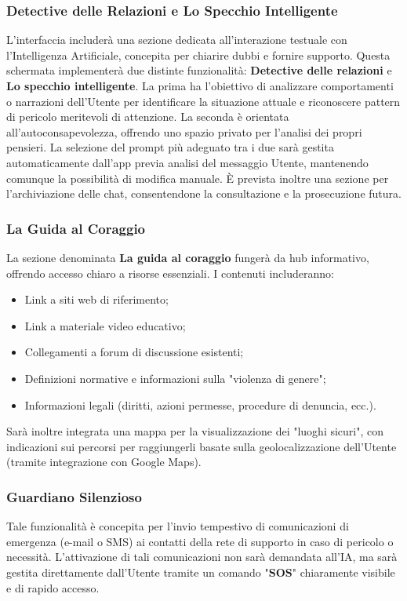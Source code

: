 \documentclass[a4paper,12pt]{article}
\begin{document}
\subsubsection{Detective delle Relazioni e Lo Specchio Intelligente}
L'interfaccia includerà una sezione dedicata all'interazione testuale con l'Intelligenza Artificiale, concepita per chiarire dubbi e fornire supporto. Questa schermata implementerà due distinte funzionalità: \textbf{Detective delle relazioni} e \textbf{Lo specchio intelligente}.
La prima ha l'obiettivo di analizzare comportamenti o narrazioni dell'Utente per identificare la situazione attuale e riconoscere pattern di pericolo meritevoli di attenzione. La seconda è orientata all'autoconsapevolezza, offrendo uno spazio privato per l'analisi dei propri pensieri.
La selezione del prompt più adeguato tra i due sarà gestita automaticamente dall'app previa analisi del messaggio Utente, mantenendo comunque la possibilità di modifica manuale. È prevista inoltre una sezione per l'archiviazione delle chat, consentendone la consultazione e la prosecuzione futura.

\subsubsection{La Guida al Coraggio}
La sezione denominata \textbf{La guida al coraggio} fungerà da hub informativo, offrendo accesso chiaro a risorse essenziali. I contenuti includeranno:
\begin{itemize}
    \item Link a siti web di riferimento;
    \item Link a materiale video educativo;
    \item Collegamenti a forum di discussione esistenti;
    \item Definizioni normative e informazioni sulla "violenza di genere";
    \item Informazioni legali (diritti, azioni permesse, procedure di denuncia, ecc.).
\end{itemize}
Sarà inoltre integrata una mappa per la visualizzazione dei "luoghi sicuri", con indicazioni sui percorsi per raggiungerli basate sulla geolocalizzazione dell'Utente (tramite integrazione con Google Maps).

\subsubsection{Guardiano Silenzioso}
Tale funzionalità è concepita per l'invio tempestivo di comunicazioni di emergenza (e-mail o SMS) ai contatti della rete di supporto in caso di pericolo o necessità. L'attivazione di tali comunicazioni non sarà demandata all'IA, ma sarà gestita direttamente dall'Utente tramite un comando "\textbf{SOS}" chiaramente visibile e di rapido accesso.
\end{document}

